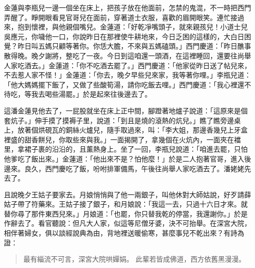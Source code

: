 金蓮與李瓶兒一邊一個坐在床上，把孩子放在他面前，怎禁的鬼混，不一時把西門弄醒了。睜開眼看見官哥兒在面前，穿著道士衣服，喜歡的眉開眼笑。連忙接過來，抱到懷裡，與他親個嘴兒。金蓮道：「好乾凈嘴頭子，就來親孩兒！小道士兒吳應元，你噦他一口，你說昨日在那裡使牛耕地來，今日乏困的這樣的，大白日困覺？昨日叫五媽只顧等著你。你恁大膽，不來與五媽磕頭。」西門慶道：「昨日醮事散得晚。晚夕謝將，整吃了一夜。今日到這咱還一頭酒，在這裡睡回，還要往尚舉人家吃酒去。」金蓮道：「你不吃酒去罷了。」西門慶道：「他家從昨日送了帖兒來，不去惹人家不怪！」金蓮道：「你去，晚夕早些兒來家，我等著你哩。」李瓶兒道：「他大媽媽擺下飯了，又做了些酸筍湯，請你吃飯去哩。」西門慶道：「我心裡還不待吃，等我去喝些湯罷。」於是起來往後邊去了。

這潘金蓮見他去了，一屁股就坐在床上正中間，腳蹬著地爐子說道：「這原來是個套炕子。」伸手摸了摸褥子里，說道：「到且是燒的滾熱的炕兒。」瞧了瞧旁邊桌上，放著個烘硯瓦的銅絲火爐兒，隨手取過來，叫：「李大姐，那邊香幾兒上牙盒裡盛的甜香餅兒，你取些來與我。」一面揭開了，拿幾個在火炕內，一面夾在襠里，拿裙子裹的沿沿的，且薰熱身上。坐了一回，李瓶兒說道：「咱進去罷，只怕他爹吃了飯出來。」金蓮道：「他出來不是？怕他麼！」於是二人抱著官哥，進入後邊來。良久，西門慶吃了飯，吩咐排軍備馬，午後往尚舉人家吃酒去了。潘姥姥先去了。

且說晚夕王姑子要家去。月娘悄悄與了他一兩銀子，叫他休對大師姑說，好歹請薛姑子帶了符藥來。王姑子接了銀子，和月娘說：「我這一去，只過十六日才來。就替你尋了那件東西兒來。」月娘道：「也罷，你只替我乾的停當，我還謝你。」於是作辭去了。看官聽說：但凡大人家，似這等尼僧牙婆，決不可抬舉。在深宮大院，相伴著婦女，俱以談經說典為由，背地裡送暖偷寒，甚麼事兒不乾出來？有詩為證：
\begin{quote}
最有緇流不可言，深宮大院哄嬋娟。
此輩若皆成佛道，西方依舊黑漫漫。
\end{quote}

